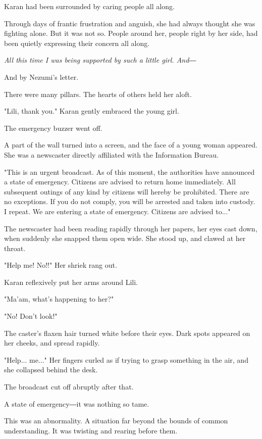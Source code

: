 Karan had been surrounded by caring people all along.

Through days of frantic frustration and anguish, she had always thought
she was fighting alone. But it was not so. People around her, people
right by her side, had been quietly expressing their concern all along.

\emph{All this time I was being supported by such a little girl. And―}


And by Nezumi's letter.

There were many pillars. The hearts of others held her aloft.

"Lili, thank you." Karan gently embraced the young girl.

The emergency buzzer went off.

A part of the wall turned into a screen, and the face of a young woman
appeared. She was a newscaster directly affiliated with the Information
Bureau.

"This is an urgent broadcast. As of this moment, the authorities have
announced a state of emergency. Citizens are advised to return home
immediately. All subsequent outings of any kind by citizens will hereby
be prohibited. There are no exceptions. If you do not comply, you will
be arrested and taken into custody. I repeat. We are entering a state of
emergency. Citizens are advised to..."

The newscaster had been reading rapidly through her papers, her eyes
cast down, when suddenly she snapped them open wide. She stood up, and
clawed at her throat.

"Help me! No!!" Her shriek rang out.

Karan reflexively put her arms around Lili.

"Ma'am, what's happening to her?"

"No! Don't look!"

The caster's flaxen hair turned white before their eyes. Dark spots
appeared on her cheeks, and spread rapidly.

"Help... me..." Her fingers curled as if trying to grasp something in
the air, and she collapsed behind the desk.

The broadcast cut off abruptly after that.

A state of emergency―it was nothing so tame.

This was an abnormality. A situation far beyond the bounds of common
understanding. It was twisting and rearing before them.

